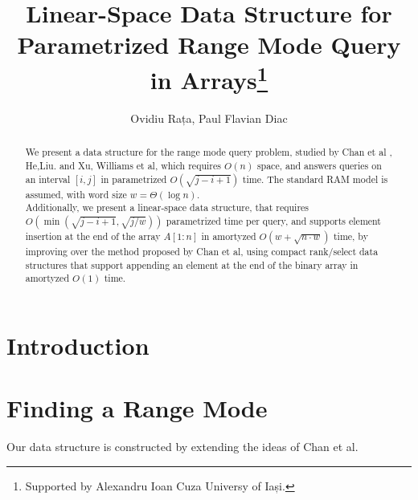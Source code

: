 \documentclass[runningheads]{llncs}
\begin{document}
%
\title{Linear-Space Data Structure for Parametrized Range Mode Query in Arrays\thanks{Supported by Alexandru Ioan Cuza Universy of Iași.}}
%
%
\author{Ovidiu Rața, Paul Flavian Diac}
%
%
%
\maketitle              %
%
\begin{abstract}
We present a data structure for the range mode query problem, studied by Chan et al \cite{chan2014linear}, He,Liu.\cite{he_et_al:LIPIcs.SEA.2023.19} and Xu, Williams et al\cite{gu2021faster}, which requires $O(n)$ space,
and answers queries on an interval $[i, j]$ in parametrized $O(\sqrt{j-i+1})$ time. The standard RAM model is assumed, with word size $w = \Theta ( \log n )$.\\

Additionally, we present a linear-space data structure, that requires \\ 
$O(\min( \sqrt{j-i+1}, \sqrt{j/w} ) )$ parametrized time per query, 
and supports element insertion at the end of the array $A[1:n]$ in amortyzed $O( w + \sqrt{n \cdot w} )$ time, by improving over the method proposed by Chan et al\cite{chan2014linear}, using compact rank/select data structures 
that support appending an element at the end of the binary array in amortyzed $O(1)$ time.


\end{abstract}
%
%
%
\section{Introduction}

\section{Finding a Range Mode}
Our data structure is constructed by extending the ideas of Chan et al\cite{chan2014linear}.
\end{document}
